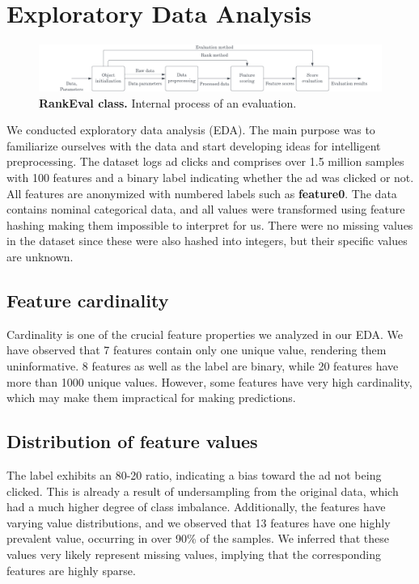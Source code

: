 \documentclass[fleqn,moreauthors,10pt]{ds_report}
\begin{document}

\section*{Exploratory Data Analysis}

\begin{figure}
	\includegraphics[width=\linewidth]{img/block_diagram_cropped.png}
	\caption{\textbf{RankEval class.} Internal process of an evaluation.}
	\label{fig:block_diagram}
\end{figure}

We conducted exploratory data analysis (EDA). The main purpose was to familiarize ourselves with the data and start developing ideas for intelligent preprocessing. The dataset logs ad clicks and comprises over 1.5 million samples with 100 features and a binary label indicating whether the ad was clicked or not. All features are anonymized with numbered labels such as \textbf{feature0}. The data contains nominal categorical data, and all values were transformed using feature hashing making them impossible to interpret for us. There were no missing values in the dataset since these were also hashed into integers, but their specific values are unknown. 

\subsection*{Feature cardinality}
Cardinality is one of the crucial feature properties we analyzed in our EDA. We have observed that 7 features contain only one unique value, rendering them uninformative. 8 features as well as the label are binary, while 20 features have more than 1000 unique values. However, some features have very high cardinality, which may make them impractical for making predictions.

\subsection*{Distribution of feature values}
The label exhibits an 80-20 ratio, indicating a bias toward the ad not being clicked. This is already a result of undersampling from the original data, which had a much higher degree of class imbalance. Additionally, the features have varying value distributions, and we observed that 13 features have one highly prevalent value, occurring in over 90\% of the samples. We inferred that these values very likely represent missing values, implying that the corresponding features are highly sparse. 
\end{document}
